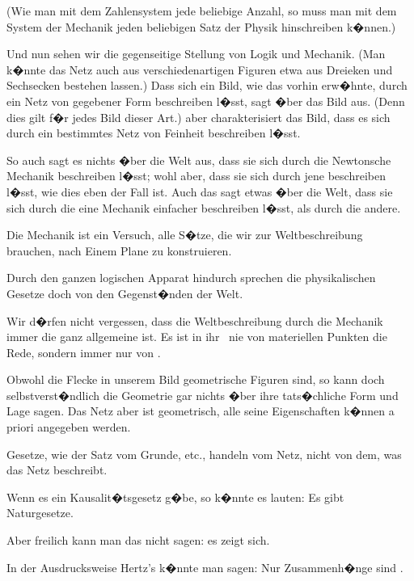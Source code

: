 \begin{propositions}
{(Wie man mit dem Zahlensystem jede beliebige
Anzahl, so muss man mit dem System der
Mechanik jeden beliebigen Satz der Physik
hinschreiben k�nnen.)}


{Und nun sehen wir die gegenseitige Stellung
von Logik und Mechanik. (Man k�nnte das Netz
auch aus verschiedenartigen Figuren etwa aus
Dreieken und Sechsecken bestehen lassen.) Dass
sich ein Bild, wie das vorhin erw�hnte, durch ein
Netz von gegebener Form beschreiben l�sst, sagt
�ber das Bild  aus. (Denn dies gilt f�r
jedes Bild dieser Art.)  aber charakterisiert
das Bild, dass es sich durch ein bestimmtes Netz
von  Feinheit  beschreiben
l�sst.

So auch sagt es nichts �ber die Welt aus, dass
sie sich durch die Newtonsche Mechanik beschreiben
l�sst; wohl aber, dass sie sich  durch
jene beschreiben l�sst, wie dies eben der Fall ist.
Auch das sagt etwas �ber die Welt, dass sie sich
durch die eine Mechanik einfacher beschreiben
l�sst, als durch die andere.}


{Die Mechanik ist ein Versuch, alle 
S�tze, die wir zur Weltbeschreibung brauchen,
nach Einem Plane zu konstruieren.}


{Durch den ganzen logischen Apparat hindurch
sprechen die physikalischen Gesetze doch von den
Gegenst�nden der Welt.}


{Wir d�rfen nicht vergessen, dass die Weltbeschreibung
durch die Mechanik immer die ganz
allgemeine ist. Es ist in ihr \zumBeispiel\ nie von
 materiellen Punkten die Rede,
sondern immer nur von .}


{Obwohl die Flecke in unserem Bild geometrische
Figuren sind, so kann doch selbstverst�ndlich
die Geometrie gar nichts �ber ihre
tats�chliche Form und Lage sagen. Das Netz
aber ist  geometrisch, alle seine Eigenschaften
k�nnen a priori angegeben werden.

Gesetze, wie der Satz vom Grunde, etc., handeln
vom Netz, nicht von dem, was das Netz beschreibt.}


{Wenn es ein Kausalit�tsgesetz g�be, so k�nnte
es lauten: \glqq{}Es gibt Naturgesetze\grqq{}.

Aber freilich kann man das nicht sagen: es
zeigt sich.}


{In der Ausdrucksweise Hertz's k�nnte man
sagen: Nur  Zusammenh�nge
sind .}



\end{propositions}
